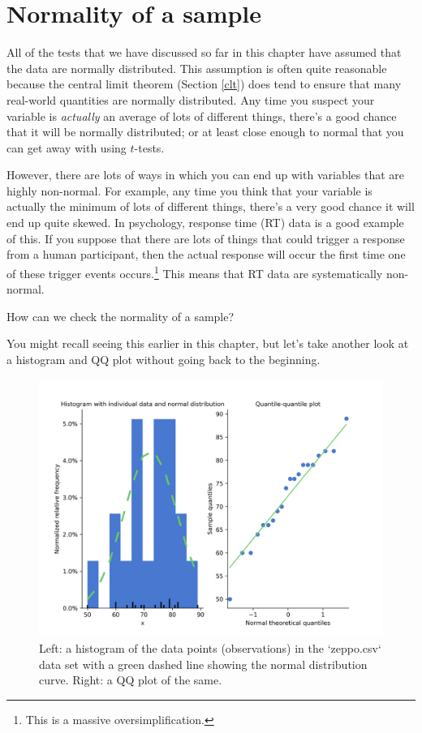 \documentclass[
]{book}
\theoremstyle{definition}
\theoremstyle{definition}
\theoremstyle{definition}
\theoremstyle{definition}
\theoremstyle{remark}
\begin{document}
\hypertarget{shapiro}{%
\section{Normality of a sample}\label{shapiro}}

All of the tests that we have discussed so far in this chapter have assumed that the data are normally distributed. This assumption is often quite reasonable because the central limit theorem (Section \ref{clt}) does tend to ensure that many real-world quantities are normally distributed. Any time you suspect your variable is \emph{actually} an average of lots of different things, there's a good chance that it will be normally distributed; or at least close enough to normal that you can get away with using \(t\)-tests.

However, there are lots of ways in which you can end up with variables that are highly non-normal. For example, any time you think that your variable is actually the minimum of lots of different things, there's a very good chance it will end up quite skewed. In psychology, response time (RT) data is a good example of this. If you suppose that there are lots of things that could trigger a response from a human participant, then the actual response will occur the first time one of these trigger events occurs.\footnote{This is a massive oversimplification.} This means that RT data are systematically non-normal.

How can we check the normality of a sample?

You might recall seeing this earlier in this chapter, but let's take another look at a histogram and QQ plot without going back to the beginning.

\begin{figure}

{\centering \includegraphics[width=0.66\linewidth]{resources/image/zeppohist} 

}

\caption{Left: a histogram of the data points (observations) in the `zeppo.csv` data set with a green dashed line showing the normal distribution curve. Right: a QQ plot of the same.}\label{fig:zeppore}
\end{figure}
\end{document}
